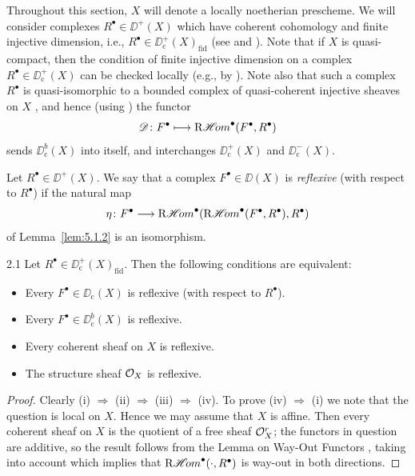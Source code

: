 Throughout this section, $X$ will denote a locally noetherian prescheme. We will consider complexes $R^\bullet\in\DD^+(X)$ which have coherent cohomology and finite injective dimension, i.e., $R^\bullet\in\DD_{\mathrm{c}}^+(X)_{\mathrm{fid}}$ (see  and ). Note that if $X$ is quasi-compact, then the condition of finite injective dimension on a complex $R^\bullet\in\DD_{\mathrm{c}}^+(X)$ can be checked locally (e.g., by ). Note also that such a complex $R^\bullet$ is quasi-isomorphic to a bounded complex of quasi-coherent injective sheaves on $X$ , and hence (using ) the functor
\[
\mathscr{D}\colon F^{\bullet}\longmapsto \mathop{\mathrm{R}\mathscr{H}\!om}\nolimits^{\bullet}(F^{\bullet}, R^{\bullet})
\]
sends $\DD_{\mathrm{c}}^{b}(X)$ into itself, and interchanges $\DD_{\mathrm{c}}^{+}(X)$ and $\DD_{\mathrm{c}}^{-}(X)$.

\begin{definition*}
Let $R^\bullet\in\DD^+(X)$. We say that a complex $F^\bullet\in\DD(X)$ is \emph{reflexive} (with respect to $R^\bullet$) if the natural map
\[
\eta\colon F^{\bullet}\longrightarrow \mathop{\mathrm{R}\mathscr{H}\!om}\nolimits^{\bullet}(\mathop{\mathrm{R}\mathscr{H}\!om}\nolimits^{\bullet}(F^{\bullet}, R^{\bullet}), R^{\bullet})
\]
of Lemma~\ref{lem:5.1.2} is an isomorphism.
\end{definition*}

\begin{bookproposition}{2.1}\label{prop:5.2.1}
Let $R^\bullet\in\DD^+_{\mathrm{c}}(X)_{\mathrm{fid}}$. Then the following conditions are equivalent:
\begin{itemize}
\item[(i)] Every $F^\bullet\in\DD_{\mathrm{c}}(X)$ is reflexive (with respect to $R^\bullet$).
\item[(ii)] Every $F^\bullet\in\DD_{\mathrm{c}}^b(X)$ is reflexive.
\item[(iii)] Every coherent sheaf on $X$ is reflexive.
\item[(iv)] The structure sheaf $\mathcal{O}_X$ is reflexive.
\end{itemize}
\end{bookproposition}

\begin{proof}
Clearly (i) $\Longrightarrow$ (ii) $\Longrightarrow$ (iii) $\Longrightarrow$ (iv). To prove (iv) $\Longrightarrow$ (i) we note that the question is local on $X$. Hence we may assume that $X$ is affine. Then every coherent sheaf on $X$ is the quotient of a free sheaf $\mathcal{O}_X^r$; the functors in question are additive, so the result follows from the Lemma on Way-Out Functors , taking into account  which implies that $\mathop{\mathrm{R}\mathscr{H}\!om}\nolimits^\bullet(\cdot,R^\bullet)$ is way-out in both directions.
\end{proof}

